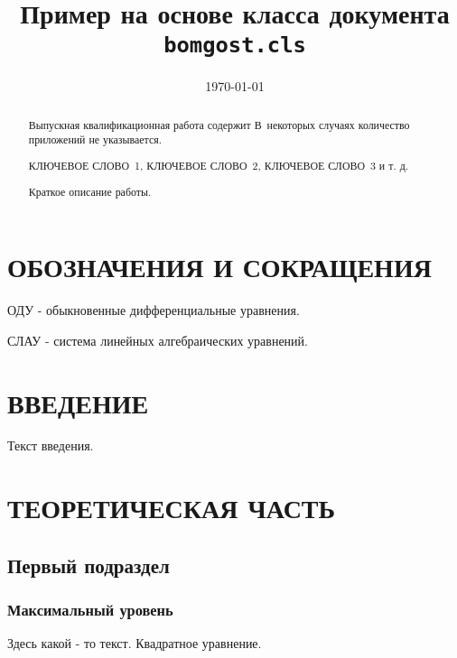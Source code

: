 \documentclass[rusmathsym, eqnumwithinsec, amspack, hyperref]{bomgost}
\author{}
\title{Пример на основе класса документа \texttt{bomgost.cls}}
\date{\today}
\begin{document}
\maketitle
\thispagestyle{empty}
\newpage

\begin{abstract}
Выпускная квалификационная работа содержит \printtotpage \printtotfig \printtottab \printtotref[.] В~некоторых случаях количество приложений не указывается. 


КЛЮЧЕВОЕ СЛОВО~1, КЛЮЧЕВОЕ СЛОВО~2, КЛЮЧЕВОЕ СЛОВО~3 и т. д.

Краткое описание работы.
\end{abstract}


\tableofcontents


\section*{ОБОЗНАЧЕНИЯ И СОКРАЩЕНИЯ}
ОДУ - обыкновенные дифференциальные уравнения.

СЛАУ - система линейных алгебраических уравнений.


\section*{ВВЕДЕНИЕ}
Текст введения.


\mainpart


\section{ТЕОРЕТИЧЕСКАЯ ЧАСТЬ}
\subsection{Первый подраздел}
\subsubsection{Максимальный уровень}
Здесь какой - то текст. Квадратное уравнение.
\end{document}
